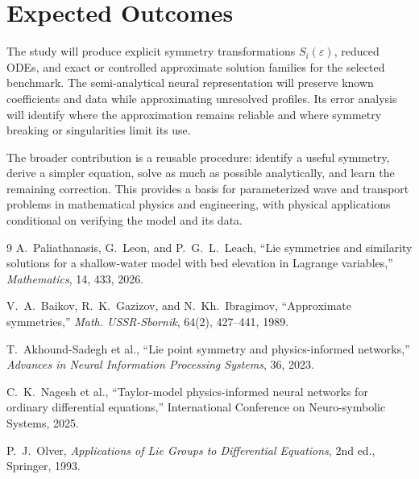 \documentclass[12pt]{article}
\newcommand{\eps}{\varepsilon}
\begin{document}
\section{Expected Outcomes}

The study will produce explicit symmetry transformations $S_i(\eps)$, reduced ODEs, and exact or controlled approximate solution families for the selected benchmark. The semi-analytical neural representation will preserve known coefficients and data while approximating unresolved profiles. Its error analysis will identify where the approximation remains reliable and where symmetry breaking or singularities limit its use.

The broader contribution is a reusable procedure: identify a useful symmetry, derive a simpler equation, solve as much as possible analytically, and learn the remaining correction. This provides a basis for parameterized wave and transport problems in mathematical physics and engineering, with physical applications conditional on verifying the model and its data.

\begin{singlespace}\small
\begin{thebibliography}{9}
A.~Paliathanasis, G.~Leon, and P.~G.~L.~Leach,
``Lie symmetries and similarity solutions for a shallow-water model with bed elevation in Lagrange variables,''
\emph{Mathematics}, 14, 433, 2026.

V.~A.~Baikov, R.~K.~Gazizov, and N.~Kh.~Ibragimov,
``Approximate symmetries,'' \emph{Math. USSR-Sbornik}, 64(2), 427--441, 1989.

T.~Akhound-Sadegh et al.,
``Lie point symmetry and physics-informed networks,''
\emph{Advances in Neural Information Processing Systems}, 36, 2023.

C.~K.~Nagesh et al.,
``Taylor-model physics-informed neural networks for ordinary differential equations,''
International Conference on Neuro-symbolic Systems, 2025.

P.~J.~Olver, \emph{Applications of Lie Groups to Differential Equations}, 2nd ed., Springer, 1993.
\end{thebibliography}
\end{singlespace}
\end{document}
